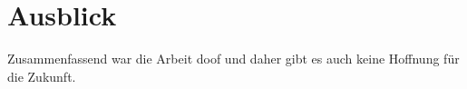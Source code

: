 \section{Ausblick}
Zusammenfassend war die Arbeit doof und daher gibt es auch keine Hoffnung für
die Zukunft.
